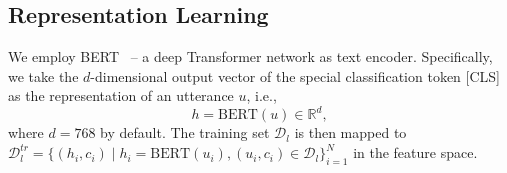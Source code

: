 



\subsection{Representation Learning}
We employ BERT~\citep{DBLP:conf/naacl/DevlinCLT19} -- a deep Transformer network as text encoder. Specifically, we take the $d$-dimensional output vector of the special classification token [CLS] as the representation of an utterance $u$, i.e.,
$$h = \text{BERT}(u) \in \mathbb{R}^d,$$ 
where $d=768$ by default. The training set $\mathcal{D}_{l}$ is then mapped to $\mathcal{D}_{l}^{tr} = \{(h_i, c_i)\mid h_i = \text{BERT}(u_i), (u_i, c_i)\in \mathcal{D}_{l}\}_{i=1}^N$ in the feature space.









